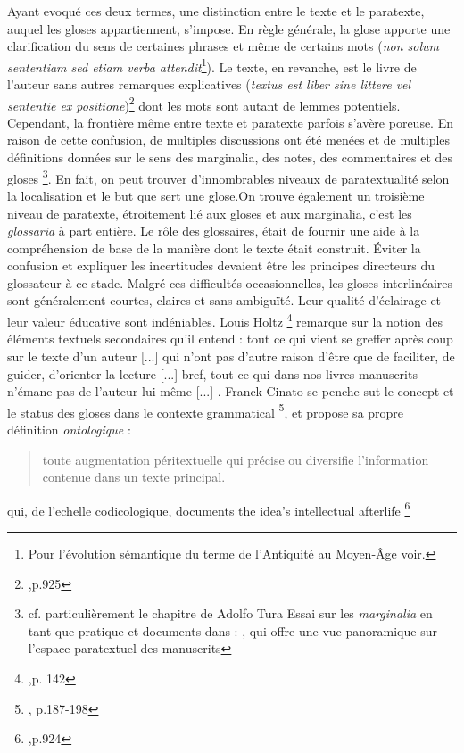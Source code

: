 \documentclass[a4paper, twoside, 12pt]{book}
\begin{document}
Ayant evoqué ces deux termes, une distinction entre le texte et le paratexte, auquel les gloses appartiennent, s'impose. 
En règle générale, la glose apporte une clarification du sens de certaines phrases et même de certains mots (\textit{non solum sententiam sed etiam verba attendit}\footnote{Pour l'évolution sémantique du terme de l'Antiquité au Moyen-Âge voir.\cite{holtz1996glossaires}}). Le texte, en revanche, est le livre de l'auteur sans autres remarques explicatives (\textit{textus est liber sine littere vel sententie ex positione})\footnote{\cite{dinkova2020text},p.925} dont les mots sont autant de lemmes potentiels. Cependant, la frontière même entre texte et paratexte parfois s'avère poreuse. En raison de cette confusion, de multiples discussions ont été menées et de multiples définitions données sur le sens des marginalia, des notes, des commentaires et des gloses \footnote{cf. particulièrement le chapitre de Adolfo Tura \og{} Essai sur les \textit{marginalia} en tant que pratique et documents \fg{} dans : \cite{jacquart2005scientia}, qui offre une vue panoramique sur l'espace paratextuel des manuscrits}. En fait, on peut trouver d'innombrables \og{}niveaux de paratextualité \fg{} selon la localisation et le but que sert une glose.On trouve également un troisième niveau de paratexte, étroitement lié aux gloses et aux marginalia, c'est les \textit{glossaria} à part entière. Le rôle des glossaires, était de fournir une aide à la compréhension de base de la manière dont le texte était construit. 
Éviter la confusion et expliquer les incertitudes devaient être les principes directeurs du glossateur à ce stade. Malgré ces difficultés occasionnelles, les gloses interlinéaires sont généralement courtes, claires et sans ambiguïté. Leur qualité d'éclairage et leur valeur éducative sont indéniables. Louis Holtz \footnote{\cite{holtz1984gloses},p. 142} remarque sur la notion des éléments textuels secondaires qu'il entend : \og{} tout ce qui vient se greffer après coup sur le texte d’un auteur [...] qui n’ont pas d’autre raison d’être que de faciliter, de guider, d’orienter la lecture [...] bref, tout ce qui dans nos livres manuscrits n’émane pas de l’auteur lui-même [...] \fg{}. Franck Cinato se penche sut le concept et le status des gloses dans le contexte grammatical \footnote{\cite{cinato2015priscien}, p.187-198}, et propose sa propre définition \textit{ontologique} : \blockquote{toute augmentation péritextuelle qui précise ou
diversifie l’information contenue dans un texte principal.} qui,  de l'echelle codicologique, \og{} documents the idea’s intellectual afterlife \footnote{\cite{dinkova2020text},p.924}\fg{}
\end{document}
